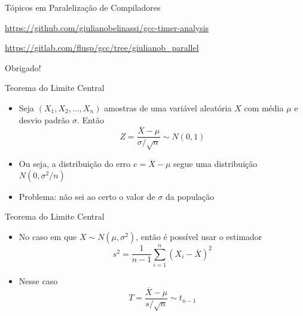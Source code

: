 \begin{frame}{Tópicos em Paralelização de Compiladores}
  \overview

  {%
    \centering\noindent%
    \url{https://github.com/giulianobelinassi/gcc-timer-analysis}\par
    \url{https://gitlab.com/flusp/gcc/tree/giulianob\_parallel}\par
  }

\end{frame}

\begin{frame}[standout]
    Obrigado!
\end{frame}

\appendix

\begin{frame}{Teorema do Limite Central}
    \begin{itemize}
        \item Seja $(X_1, X_2, \dots, X_n)$ amostras de uma variável aleatória $X$ com média
            $\mu$ e desvio padrão $\sigma$. Então
            $$ Z = \frac{\overline{X} - \mu}{\sigma / \sqrt{n}} \sim N(0, 1)$$
        \item Ou seja, a distribuição do erro $e = \overline{X} - \mu$ segue uma distribuição $N(0, \sigma^2/n)$
        \item Problema: não sei ao certo o valor de $\sigma$ da população
    \end{itemize}
\end{frame}

\begin{frame}{Teorema do Limite Central}
    \begin{itemize}
        \item No caso em que $X \sim N(\mu, \sigma^2)$, então é possível usar o estimador
            $$s^2 = \frac{1}{n-1}\sum_{i=1}^n (X_i - \overline{X})^2$$
        \item Nesse caso
            $$ T = \frac{\overline{X} - \mu}{s / \sqrt{n}} \sim t_{n-1}$$
    \end{itemize}
\end{frame}

